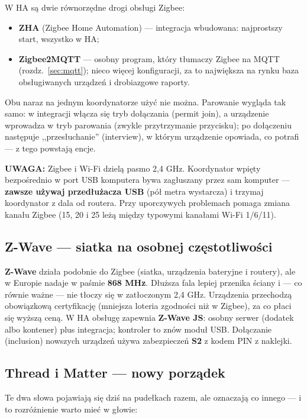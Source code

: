 \documentclass[11pt,a4paper]{article}
\newcommand{\uwaga}[1]{\par\medskip\noindent\textcolor{warnred}{\textbf{UWAGA:}} #1\par\medskip}
\begin{document}
W HA są dwie równorzędne drogi obsługi Zigbee:
\begin{itemize}
\item \textbf{ZHA} (Zigbee Home Automation) --- integracja wbudowana: najprostszy start, wszystko w HA;
\item \textbf{Zigbee2MQTT} --- osobny program, który tłumaczy Zigbee na MQTT (rozdz.~\ref{sec:mqtt}); nieco więcej konfiguracji, za to największa na rynku baza obsługiwanych urządzeń i drobiazgowe raporty.
\end{itemize}
Obu naraz na jednym koordynatorze użyć nie można. Parowanie wygląda tak samo: w integracji włącza się tryb dołączania (permit join), a urządzenie wprowadza w tryb parowania (zwykle przytrzymanie przycisku); po dołączeniu następuje ,,przesłuchanie'' (interview), w którym urządzenie opowiada, co potrafi --- z tego powstają encje.

\uwaga{Zigbee i Wi-Fi dzielą pasmo 2,4 GHz. Koordynator wpięty bezpośrednio w port USB komputera bywa zagłuszany przez sam komputer --- \textbf{zawsze używaj przedłużacza USB} (pół metra wystarcza) i trzymaj koordynator z dala od routera. Przy uporczywych problemach pomaga zmiana kanału Zigbee (15, 20 i 25 leżą między typowymi kanałami Wi-Fi 1/6/11).}

\subsection{Z-Wave --- siatka na osobnej częstotliwości}

\textbf{Z-Wave} działa podobnie do Zigbee (siatka, urządzenia bateryjne i routery), ale w Europie nadaje w paśmie \textbf{868 MHz}. Dłuższa fala lepiej przenika ściany i --- co równie ważne --- nie tłoczy się w zatłoczonym 2,4 GHz. Urządzenia przechodzą obowiązkową certyfikację (mniejsza loteria zgodności niż w Zigbee), za co płaci się wyższą ceną. W HA obsługę zapewnia \textbf{Z-Wave JS}: osobny serwer (dodatek albo kontener) plus integracja; kontroler to znów moduł USB. Dołączanie (inclusion) nowszych urządzeń używa zabezpieczeń \textbf{S2} z kodem PIN z naklejki.

\subsection{Thread i Matter --- nowy porządek}
\label{sec:matter}

Te dwa słowa pojawiają się dziś na pudełkach razem, ale oznaczają co innego --- i to rozróżnienie warto mieć w głowie:
\end{document}
